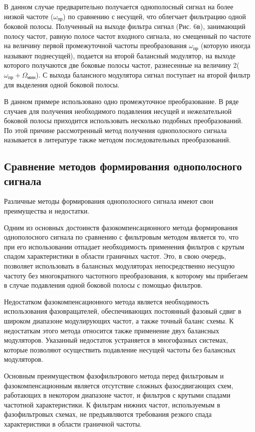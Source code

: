 В данном случае предварительно получается однополосный сигнал на более низкой частоте ($\omega_{\text{пр}}$) по сравнению с несущей, что облегчает фильтрацию одной боковой полосы. Полученный на выходе фильтра сигнал (Рис. 6в), занимающий полосу частот, равную полосе частот входного сигнала, но смещенный по частоте на величину первой промежуточной частоты преобразования $\omega_{\text{пр}}$ (которую иногда называют поднесущей), подается на второй балансный модулятор, на выходе которого получаются две боковые
полосы частот, разнесенные на величину 2($\omega_{\text{пр}}+\Omega_{\text{мин}}$). С выхода балансного модулятора сигнал поступает на второй фильтр для выделения одной боковой полосы.

В данном примере использовано одно промежуточное преобразование. В ряде случаев для получения необходимого подавления несущей и нежелательной боковой полосы приходится использовать несколько подобных преобразований. По этой причине рассмотренный метод получения однополосного сигнала называется в литературе также методом
последовательных преобразований. 

\subsection{Сравнение методов формирования однополосного сигнала}

Различные методы формирования однополосного сигнала имеют свои преимущества и недостатки.

Одним из основных достоинств фазокомпенсационного метода формирования однополосного сигнала по сравнению с фильтровым методом является то, что при его использовании отпадает необходимость применения фильтров с крутым спадом характеристики в области граничных частот. Это, в свою очередь, позволяет использовать в балансных модуляторах непосредственно несущую частоту без многократного частотного преобразования, к которому мы прибегаем в случае подавления одной боковой полосы с помощью фильтров.

Недостатком фазокомпенсационного метода является необходимость использования фазовращателей, обеспечивающих постоянный фазовый сдвиг в широком диапазоне модулирующих частот, а также точный баланс схемы. К недостаткам этого метода относится также применение двух балансных
модуляторов. Указанный недостаток устраняется в многофазных системах, которые позволяют осуществить подавление несущей частоты без балансных модуляторов.

Основным преимуществом фазофильтрового метода перед фильтровым и фазокомпенсационным является отсутствие сложных фазосдвигающих схем, работающих в некотором диапазоне частот, и фильтров с крутыми спадами частотной характеристики. К фильтрам нижних частот, используемым в фазофильтровых схемах, не предъявляются требования резкого спада характеристики в области граничной частоты. 

